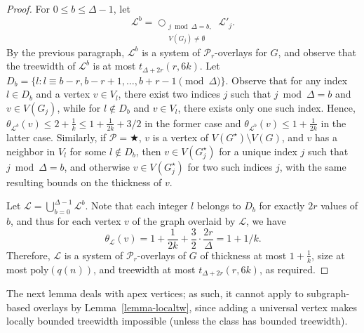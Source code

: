 \documentclass[a4paper,11pt]{article}
\newcommand{\LL}{{\mathcal L}}
\newcommand{\PP}{{\mathcal P}}
\newcommand{\poly}{\text{poly}}
\begin{document}
\begin{proof}
For $0\le b\le \Delta-1$, let $$\LL^b=\bigcirc_{\substack{j\bmod \Delta=b,\\V(G_j)\neq\emptyset}} \LL'_j.$$
By the previous paragraph, $\LL^b$ is a system of $\PP_r$-overlays for $G$, and observe that the treewidth of $\LL^b$ is at most $t_{\Delta+2r}(r,6k)$.
Let $D_b=\{l:l\equiv b-r,b-r+1,\ldots, b+r-1\pmod\Delta\}$.  Observe that for any index $l\in D_b$ and a vertex $v\in V_l$,
there exist two indices $j$ such that $j\bmod \Delta=b$ and $v\in V(G_j)$, while for $l\not\in D_b$ and $v\in V_l$, there exists
only one such index.  Hence, $\theta_{\LL^b}(v)\le 2+\frac{1}{k}\le 1+\frac{1}{2k}+3/2$ in the former case and $\theta_{\LL^b}(v)\le 1+\frac{1}{2k}$ in the
latter case.  Similarly, if $\PP=\bigstar$, $v$ is a vertex of $V(G^\star)\setminus V(G)$, and $v$ has a neighbor in $V_l$ for some $l\not\in D_b$, then
$v\in V(G_j^\star)$ for a unique index $j$ such that $j\bmod \Delta=b$, and otherwise $v\in V(G_j^\star)$ for two such indices $j$,
with the same resulting bounds on the thickness of $v$.

Let $\LL=\bigcup_{b=0}^{\Delta-1} \LL^b$.  Note that each integer $l$ belongs to $D_b$ for exactly $2r$ values of $b$,
and thus for each vertex $v$ of the graph overlaid by $\LL$, we have
$$\theta_{\LL}(v)=1+\frac{1}{2k}+\frac{3}{2}\cdot\frac{2r}{\Delta}=1+1/k.$$
Therefore, $\LL$ is a system of $\PP_r$-overlays of $G$ of thickness at most $1+\frac{1}{k}$, size at most $\poly(q(n))$, and treewidth at most $t_{\Delta+2r}(r,6k)$,
as required.
\end{proof}

The next lemma deals with apex vertices; as such, it cannot apply to subgraph-based overlays by Lemma~\ref{lemma-localtw}, since adding a universal vertex
makes locally bounded treewidth impossible (unless the class has bounded treewidth).
\end{document}
